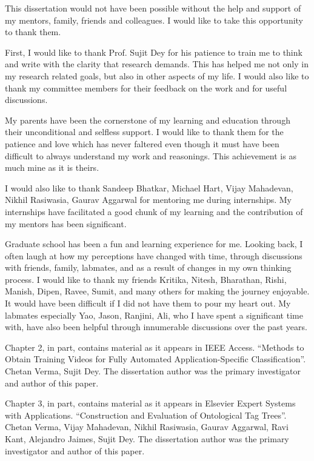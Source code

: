 \documentclass[12pt]{ucsddissertation}
\begin{document}
\begin{acknowledgements}


This dissertation would not have been possible without the help and support of my mentors, family, friends and colleagues. I would like to take this opportunity to thank them. 


First, I would like to thank Prof. Sujit Dey for his patience to train me to think and write with the clarity that research demands. This has helped me not only in my research related goals, but also in other aspects of my life. I would also like to thank my committee members for their feedback on the work and for useful discussions. 

My parents have been the cornerstone of my learning and education through their unconditional and selfless support. I would like to thank them for the patience and love which has never faltered even though it must have been difficult to always understand my work and reasonings. This achievement is as much mine as it is theirs. 

I would also like to thank Sandeep Bhatkar, Michael Hart, Vijay Mahadevan, Nikhil Rasiwasia, Gaurav Aggarwal for mentoring me during internships. My internships have facilitated a good chunk of my learning and the contribution of my mentors has been significant. 

Graduate school has been a fun and learning experience for me. Looking back, I often laugh at how my perceptions have changed with time, through discussions with friends, family, labmates, and as a result of changes in my own thinking process. I would like to thank my friends Kritika, Nitesh, Bharathan, Rishi, Manish, Dipen, Ravee, Sumit, and many others for making the journey enjoyable. It would have been difficult if I did not have them to pour my heart out. My labmates especially Yao, Jason, Ranjini, Ali, who I have spent a significant time with, have also been helpful through innumerable discussions over the past years.  


Chapter 2, in part, contains material as it appears in IEEE Access. ``Methods to Obtain Training Videos for Fully Automated Application-Specific Classification''. Chetan Verma, Sujit Dey. The dissertation author was the primary investigator and author of this paper. 

Chapter 3, in part, contains material as it appears in Elsevier Expert Systems with Applications. ``Construction and Evaluation of Ontological Tag Trees''. Chetan Verma, Vijay Mahadevan, Nikhil Rasiwasia, Gaurav Aggarwal, Ravi Kant, Alejandro Jaimes, Sujit Dey. The dissertation author was the primary investigator and author of this paper. 


\end{acknowledgements}
\end{document}
